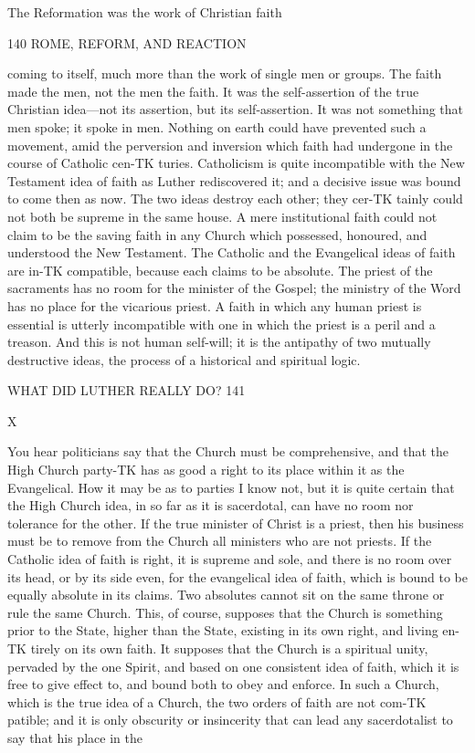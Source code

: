 \documentclass[12pt,a5paper,oneside]{book}
\begin{document}
{The Reformation was the work of Christian faith 



140 ROME, REFORM, AND REACTION 

coming to itself, much more than the work of single 
men or groups. The faith made the men, not the 
men the faith. It was the self-assertion of the true 
Christian idea---not its assertion, but its self-assertion. 
It was not something that men spoke; it spoke in 
men. Nothing on earth could have prevented such a 
movement, amid the perversion and inversion which 
faith had undergone in the course of Catholic cen-TK
turies. Catholicism is quite incompatible with the 
New Testament idea of faith as Luther rediscovered 
it; and a decisive issue was bound to come then as 
now. The two ideas destroy each other; they cer-TK
tainly could not both be supreme in the same house. 
A mere institutional faith could not claim to be 
the saving faith in any Church which possessed, 
honoured, and understood the New Testament. The 
Catholic and the Evangelical ideas of faith are in-TK
compatible, because each claims to be absolute. The 
priest of the sacraments has no room for the minister 
of the Gospel; the ministry of the Word has no 
place for the vicarious priest. A faith in which any 
human priest is essential is utterly incompatible with 
one in which the priest is a peril and a treason. And 
this is not human self-will; it is the antipathy of two 
mutually destructive ideas, the process of a historical 
and spiritual logic. 



WHAT DID LUTHER REALLY DO? 141 

X 

You hear politicians say that the Church must 
be comprehensive, and that the High Church party-TK
has as good a right to its place within it as the 
Evangelical. How it may be as to parties I know 
not, but it is quite certain that the High Church 
idea, in so far as it is sacerdotal, can have no room 
nor tolerance for the other. If the true minister of 
Christ is a priest, then his business must be to 
remove from the Church all ministers who are not 
priests. If the Catholic idea of faith is right, it is 
supreme and sole, and there is no room over its head, 
or by its side even, for the evangelical idea of faith, 
which is bound to be equally absolute in its claims. 
Two absolutes cannot sit on the same throne or rule 
the same Church. This, of course, supposes that the 
Church is something prior to the State, higher than 
the State, existing in its own right, and living en-TK
tirely on its own faith. It supposes that the Church 
is a spiritual unity, pervaded by the one Spirit, and 
based on one consistent idea of faith, which it is 
free to give effect to, and bound both to obey and 
enforce. In such a Church, which is the true idea 
of a Church, the two orders of faith are not com-TK
patible; and it is only obscurity or insincerity that 
can lead any sacerdotalist to say that his place in the 



}
\end{document}
